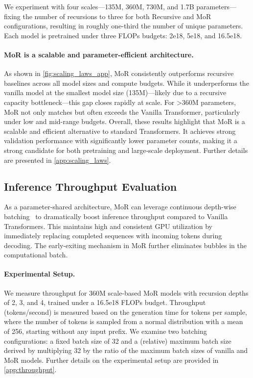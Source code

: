 We experiment with four scales—135M, 360M, 730M, and 1.7B parameters—fixing the number of recursions to three for both Recursive and MoR configurations, resulting in roughly one-third the number of unique parameters. Each model is pretrained under three FLOPs budgets: 2e18, 5e18, and 16.5e18.


\vspace{-10pt}
\paragraph{MoR is a scalable and parameter-efficient architecture.}

As shown in \autoref{fig:scaling_laws_app}, MoR consistently outperforms recursive baselines across all model sizes and compute budgets. While it underperforms the vanilla model at the smallest model size (135M)—likely due to a recursive capacity bottleneck—this gap closes rapidly at scale. For >360M parameters, MoR not only matches but often exceeds the Vanilla Transformer, particularly under low and mid-range budgets. Overall, these results highlight that MoR is a scalable and efficient alternative to standard Transformers. It achieves strong validation performance with significantly lower parameter counts, making it a strong candidate for both pretraining and large‑scale deployment. Further details are presented in \autoref{app:scaling_laws}.


\subsection{Inference Throughput Evaluation}
\label{subsec:efficiency}

As a parameter-shared architecture, MoR can leverage continuous depth-wise batching~\citep{bae2024relaxed} to dramatically boost inference throughput compared to Vanilla Transformers. This maintains high and consistent GPU utilization by immediately replacing completed sequences with incoming tokens during decoding. The early-exiting mechanism in MoR further eliminates bubbles in the computational batch.

\vspace{-10pt}
\paragraph{Experimental Setup.}

We measure throughput for 360M scale-based MoR models with recursion depths of 2, 3, and 4, trained under a 16.5e18 FLOPs budget. Throughput (tokens/second) is measured based on the generation time for tokens per sample, where the number of tokens is sampled from a normal distribution with a mean of 256, starting without any input prefix. We examine two batching configurations: a fixed batch size of 32 and a (relative) maximum batch size derived by multiplying 32 by the ratio of the maximum batch sizes of vanilla and MoR models. Further details on the experimental setup are provided in \autoref{app:throughput}.

